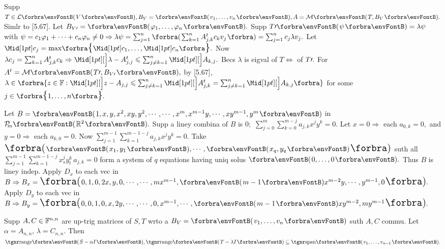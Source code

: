 Supp $T\in\Lm{V},B_V=\Par{v_1,\dots,v_n},A=\Mt{T,B_V}.$ Simlr to [5.67]. Let $B_{V\apostrophe}=\Par{\varphi_1,\dots,\varphi_n}.$\vspace{1.5pt}\parSol{}
Supp $T\apostrophe\Par{\psi}=\lambda\psi$ with $\psi=c_1\varphi_1+\dots+c_n\varphi_n\neq0\Rightarrow\lambda\psi=\sum_{j=1}^n\BigBigPar{{\sum_{k=1}^nA^t_{j,k}c_kv_j}}=\sum_{j=1}^nc_j\lambda v_j.$\vspace{3pt}\parSol{}
Let $\aMid{c_j}=\max\!\Bra{\aMid{c_1},\dots,\aMid{c_n}}.$ Now $\lambda c_j=\sum_{k=1}^nA^t_{j,k}c_k\Rightarrow\aXMid{\lambda-A^t_{j,j}}\leqslant\sum_{j\neq k=1}^n\aXMid{A_{k,j}}.$\PfEnd\vspace{6pt}\parSol{}
\Or Becs $\lambda$ is eigval of $T\Longleftrightarrow$ of $T\prime.$ For $A^t=\Mt{T\apostrophe,B_{V\apostrophe}},$ by [5.67],\vspace{1pt}\parSol{}
$\lambda\in\BigBra{z\in\Fbb:\aXMid{z-A_{j,j}}\leqslant\sum_{j\neq k=1}^n\aXMid{A^t_{j,k}}=\sum_{j\neq k=1}^n\aXMid{A_{k,j}}}$ for some $j\in\Bra{1,\dots,n}.$\PfEnd
\SepLine
\ChEnd\pagebreak


\vspace{4pt}

Let $B=\Par{1,x,y,x^2,xy,y^2,\cdots,\cdots,x^m,x^{m-1}y,\cdots,xy^{m-1},y^m}$ in $\PoFx{m}{\Rbb^2}.$\parSol{}
Supp a liney combina of $B$ is $0;$ \;$\sum_{j=0}^m\sum_{k=0}^{m-j}a_{j,k}x^jy^k=0.$\parSol{}
Let $x=0\Rightarrow$ each $a_{0,k}=0,$ and $y=0\Rightarrow$ each $a_{k,0}=0.$ Now $\sum_{j=1}^{m-1}\sum_{k=1}^{m-1-j}a_{j,k}x^jy^k=0.$\parSol{}
Take $\BigPar{\Par{x_1,y_1},\cdots,\Par{x_q,y_q}}$  suth all $\sum_{j=1}^{m-1}\sum_{k=1}^{m-1-j}x_s^jy_t^k\,a_{j,k}=0$\parSol{}
form a system of $q$ equations having uniq solus $\Par{0,\dots,0}.$ Thus $B$ is liney indep.\parSol{}
Apply $D_x$ to each vec in $B\Rightarrow B_x=\BigPar{0,1,0,2x,y,0,\cdots,\cdots,mx^{m-1},\Par{m-1}x^{m-2}y,\cdots,y^{m-1},0}.$\parSol{}
Apply $D_y$ to each vec in $B\Rightarrow B_y=\BigPar{0,0,1,0,x,2y,\cdots,\cdots,0,x^{m-1},\cdots,\Par{m-1}xy^{m-2},my^{m-1}}.$\PfEnd
\SepLine

Supp $A,C\in{\mathbb{F}}^{n,n}$ are up-trig matrices of $S,T$ wrto a $B_V=\Par{v_1,\dots,v_n}$ suth $A,C$ commu.\parSol{}
Let $\alpha=A_{n,n},\,\lambda=C_{n,n}.$ Then $\Range\Par{S-\alpha I},\Range\Par{T-\lambda I}\subseteq\Span{v_1,\dots,v_{n-1}}.$\PfEnd
\SepLine

